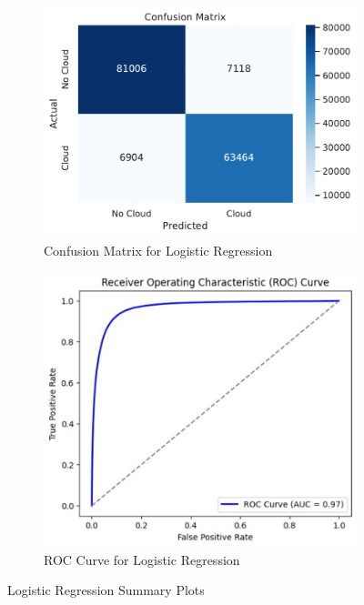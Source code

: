 \documentclass[11pt,letterpaper]{article}
\begin{document}
\begin{figure}[H]
  \centering
  \begin{subfigure}[b]{0.48\textwidth}
      \centering
      \includegraphics[width=\textwidth]{figs/lr1.pdf}
      \caption{Confusion Matrix for Logistic Regression}
      \label{fig:LR_CM}
  \end{subfigure}
  \hfill
  \begin{subfigure}[b]{0.48\textwidth}
      \centering
      \includegraphics[width=\textwidth]{figs/lr2.pdf}
      \caption{ROC Curve for Logistic Regression}
      \label{fig:LR_ROC}
  \end{subfigure}
  \caption{Logistic Regression Summary Plots}
  \label{fig:LR_plots}
\end{figure}\noindent
\end{document}
